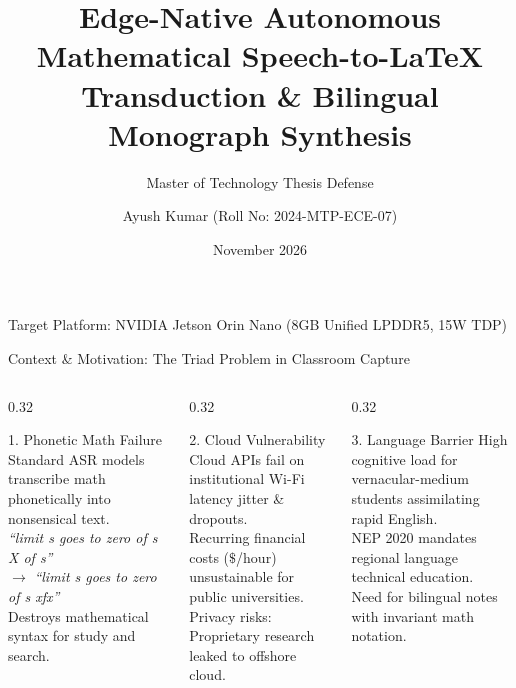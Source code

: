 \documentclass[aspectratio=169,10pt]{beamer}
\title[Edge-Native Bilingual Speech-to-LaTeX]{Edge-Native Autonomous Mathematical Speech-to-LaTeX Transduction \& Bilingual Monograph Synthesis}
\subtitle{Master of Technology Thesis Defense}
\author[Ayush Kumar]{Ayush Kumar \quad (Roll No: 2024-MTP-ECE-07)}
\institute[IIT]{Department of Electrical \& Computer Engineering \\ Indian Institute of Technology}
\date{November 2026}
\begin{document}
\begin{frame}[plain]
  \titlepage
  \begin{center}
    \footnotesize\color{mutedgray} Target Platform: NVIDIA Jetson Orin Nano (8GB Unified LPDDR5, 15W TDP)
  \end{center}
\end{frame}

\begin{frame}{Context \& Motivation: The Triad Problem in Classroom Capture}
  \begin{columns}[T]
    \begin{column}{0.32\textwidth}
      \begin{block}{1. Phonetic Math Failure}
        \footnotesize
        Standard ASR models transcribe math phonetically into nonsensical text.\\
        \textit{``limit s goes to zero of s X of s''}\\
        $\to$ \textit{``limit s goes to zero of s xfx''}\\
        Destroys mathematical syntax for study and search.
      \end{block}
    \end{column}
    \begin{column}{0.32\textwidth}
      \begin{block}{2. Cloud Vulnerability}
        \footnotesize
        Cloud APIs fail on institutional Wi-Fi latency jitter \& dropouts.\\
        Recurring financial costs ($\$$/hour) unsustainable for public universities.\\
        Privacy risks: Proprietary research leaked to offshore cloud.
      \end{block}
    \end{column}
    \begin{column}{0.32\textwidth}
      \begin{block}{3. Language Barrier}
        \footnotesize
        High cognitive load for vernacular-medium students assimilating rapid English.\\
        NEP 2020 mandates regional language technical education.\\
        Need for bilingual notes with invariant math notation.
      \end{block}
    \end{column}
  \end{columns}
\end{frame}
\end{document}
